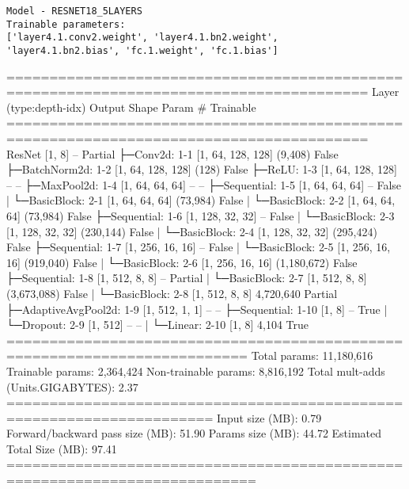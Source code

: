 \newpage
\EN
\centering %
\begin{verbatim}
Model - RESNET18_5LAYERS
Trainable parameters: 
['layer4.1.conv2.weight', 'layer4.1.bn2.weight', 
'layer4.1.bn2.bias', 'fc.1.weight', 'fc.1.bias']
\end{verbatim}

\begin{minipage}{\linewidth} %
\begin{CodeBlock}
========================================================================================
Layer (type:depth-idx)           Output Shape              Param #           Trainable
========================================================================================
ResNet                           [1, 8]                    --                Partial
├─Conv2d: 1-1                    [1, 64, 128, 128]         (9,408)           False
├─BatchNorm2d: 1-2               [1, 64, 128, 128]         (128)             False
├─ReLU: 1-3                      [1, 64, 128, 128]         --                --
├─MaxPool2d: 1-4                 [1, 64, 64, 64]           --                --
├─Sequential: 1-5                [1, 64, 64, 64]           --                False
|    └─BasicBlock: 2-1           [1, 64, 64, 64]           (73,984)          False
|    └─BasicBlock: 2-2           [1, 64, 64, 64]           (73,984)          False
├─Sequential: 1-6                [1, 128, 32, 32]          --                False
|    └─BasicBlock: 2-3           [1, 128, 32, 32]          (230,144)         False
|    └─BasicBlock: 2-4           [1, 128, 32, 32]          (295,424)         False
├─Sequential: 1-7                [1, 256, 16, 16]          --                False
|    └─BasicBlock: 2-5           [1, 256, 16, 16]          (919,040)         False
|    └─BasicBlock: 2-6           [1, 256, 16, 16]          (1,180,672)       False
├─Sequential: 1-8                [1, 512, 8, 8]            --                Partial
|    └─BasicBlock: 2-7           [1, 512, 8, 8]            (3,673,088)       False
|    └─BasicBlock: 2-8           [1, 512, 8, 8]            4,720,640         Partial
├─AdaptiveAvgPool2d: 1-9         [1, 512, 1, 1]            --                --
├─Sequential: 1-10               [1, 8]                    --                True
|    └─Dropout: 2-9              [1, 512]                  --                --
|    └─Linear: 2-10              [1, 8]                    4,104             True
==========================================================================
Total params: 11,180,616
Trainable params: 2,364,424
Non-trainable params: 8,816,192
Total mult-adds (Units.GIGABYTES): 2.37
======================================================================
Input size (MB): 0.79
Forward/backward pass size (MB): 51.90
Params size (MB): 44.72
Estimated Total Size (MB): 97.41
===========================================================================
\end{CodeBlock}
\end{minipage}
\HE
